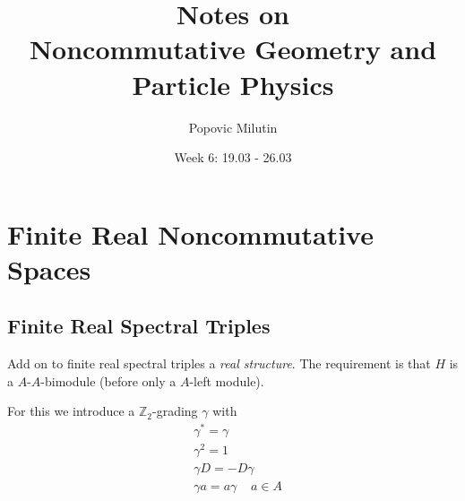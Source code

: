 \documentclass[a4paper]{article}
\title{Notes on \\ Noncommutative Geometry and Particle Physics}
\author{Popovic Milutin}
\date{Week 6: 19.03 - 26.03}
\theoremstyle{definition}
\theoremstyle{definition}
\theoremstyle{definition}
\theoremstyle{theorem}
\theoremstyle{theorem}
\begin{document}
\maketitle
\tableofcontents

\section{Finite Real Noncommutative Spaces}
\subsection{Finite Real Spectral Triples}
Add on to finite real spectral triples a \textit{real structure}. The
requirement is that $H$ is a $A$-$A$-bimodule (before only a $A$-left
module).
\newline

For this we introduce a $\mathbb{Z}_2$-grading $\gamma$ with
\begin{align}
    &\gamma ^* = \gamma \\
    &\gamma ^2 = 1 \\
    &\gamma D = - D \gamma\\
    &\gamma a = a \gamma \;\;\;\; a\in A
\end{align}
\end{document}
